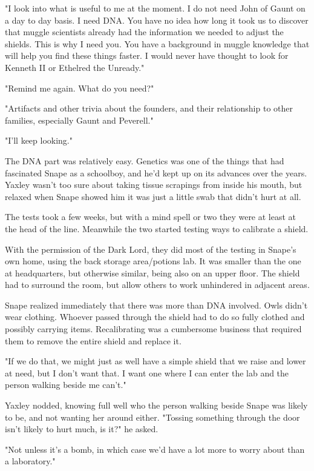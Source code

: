 \documentclass[a4paper,11pt]{article}
\begin{document}
"I look into what is useful to me at the moment. I do not need John of Gaunt on a day to day basis. I need DNA. You have no idea how long it took us to discover that muggle scientists already had the information we needed to adjust the shields. This is why I need you. You have a background in muggle knowledge that will help you find these things faster. I would never have thought to look for Kenneth II or Ethelred the Unready."

"Remind me again. What do you need?"

"Artifacts and other trivia about the founders, and their relationship to other families, especially Gaunt and Peverell."

"I'll keep looking."

The DNA part was relatively easy. Genetics was one of the things that had fascinated Snape as a schoolboy, and he'd kept up on its advances over the years. Yaxley wasn't too sure about taking tissue scrapings from inside his mouth, but relaxed when Snape showed him it was just a little swab that didn't hurt at all.

The tests took a few weeks, but with a mind spell or two they were at least at the head of the line. Meanwhile the two started testing ways to calibrate a shield.

With the permission of the Dark Lord, they did most of the testing in Snape's own home, using the back storage area/potions lab. It was smaller than the one at headquarters, but otherwise similar, being also on an upper floor. The shield had to surround the room, but allow others to work unhindered in adjacent areas.

Snape realized immediately that there was more than DNA involved. Owls didn't wear clothing. Whoever passed through the shield had to do so fully clothed and possibly carrying items. Recalibrating was a cumbersome business that required them to remove the entire shield and replace it.

"If we do that, we might just as well have a simple shield that we raise and lower at need, but I don't want that. I want one where I can enter the lab and the person walking beside me can't."

Yaxley nodded, knowing full well who the person walking beside Snape was likely to be, and not wanting her around either. "Tossing something through the door isn't likely to hurt much, is it?" he asked.

"Not unless it's a bomb, in which case we'd have a lot more to worry about than a laboratory."
\end{document}
